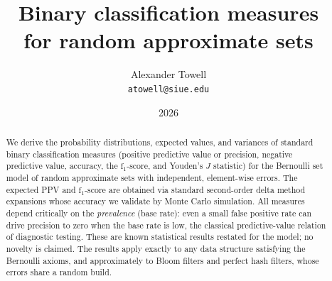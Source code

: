 \documentclass[11pt,final,hidelinks]{article}
\title
{
    Binary classification measures\\
    \large for random approximate sets
}
\author
{
    Alexander Towell\\
    \texttt{atowell@siue.edu}
}
\date{2026}
\numberwithin{equation}{section}
\newcommand{\fone}{\mathrm{f}_1}
\begin{document}
\maketitle
\begin{abstract}
We derive the probability distributions, expected values, and variances of standard binary classification measures (positive predictive value or precision, negative predictive value, accuracy, the $\fone$-score, and Youden's $J$ statistic) for the Bernoulli set model of random approximate sets with independent, element-wise errors.
The expected PPV and $\fone$-score are obtained via standard second-order delta method expansions whose accuracy we validate by Monte Carlo simulation.
All measures depend critically on the \emph{prevalence} (base rate): even a small false positive rate can drive precision to zero when the base rate is low, the classical predictive-value relation of diagnostic testing.
These are known statistical results restated for the model; no novelty is claimed.
The results apply exactly to any data structure satisfying the Bernoulli axioms, and approximately to Bloom filters and perfect hash filters, whose errors share a random build.
\end{abstract}



\tableofcontents
{}






\appendices



\end{document}

